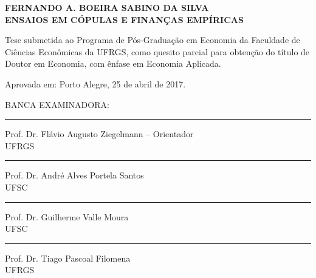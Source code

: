 \documentclass[a4paper,12pt]{report}
\begin{document}
	
	
	
	\begin{titlepage}
		\setlength{\baselineskip}{24pt}
		\centering
		\large {
			
			\textbf{FERNANDO A. BOEIRA SABINO DA SILVA} \\ [2cm]
			
			
			\textbf{ENSAIOS EM CÓPULAS E FINANÇAS EMPÍRICAS} \\ [1.5cm]
			
			
			
			\hfill
			\hspace{.45\textwidth}
			\begin{minipage}{.5\textwidth}
				Tese submetida ao Programa de Pós-Graduação em Economia da Faculdade de Ciências Econômicas da UFRGS, como quesito parcial para obtenção do
				título de Doutor em Economia, com ênfase em Economia Aplicada.  \\ [1cm]
			\end{minipage}
			
			
			\begin{flushleft}
			\noindent
			Aprovada em: Porto Alegre, 25 de abril de 2017.\\
			\vspace{1.5cm}
			
			\noindent
			BANCA EXAMINADORA:\\
			
			\vspace{4pt}
			\noindent
			\rule{\textwidth}{1pt}
			Prof. Dr. Flávio Augusto Ziegelmann -- Orientador\\
			UFRGS\\
			
			\vspace{4pt}
			\noindent
			\rule{\textwidth}{1pt}
			Prof. Dr. André Alves Portela Santos\\
			UFSC\\
			
			\vspace{4pt}
			\noindent
			\rule{\textwidth}{1pt}
			Prof. Dr. Guilherme Valle Moura\\
			UFSC\\
			
			\vspace{4pt}
			\noindent
			\rule{\textwidth}{1pt}
			Prof. Dr. Tiago Pascoal Filomena\\
			UFRGS\\
			
			\end{flushleft}
			
}		
	\end{titlepage}
	
\end{document}
